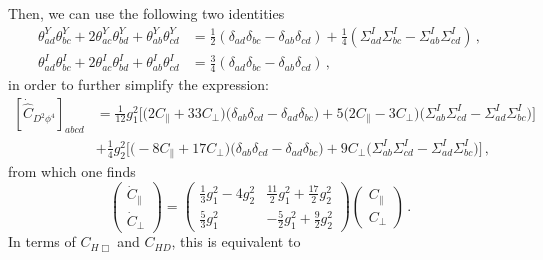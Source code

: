 Then, we can use the following two identities
\begin{align}
    \theta^Y_{ad}\theta^Y_{bc}+2\theta^Y_{ac}\theta^Y_{bd}+\theta^Y_{ab}\theta^Y_{cd}&=\frac{1}{2}\left(\delta_{ad}\delta_{bc}-\delta_{ab}\delta_{cd}\right)+\frac{1}{4}\left(\Sigma^I_{ad}\Sigma^I_{bc}-\Sigma^I_{ab}\Sigma^I_{cd}\right) \,,\\
    \theta^I_{ad}\theta^I_{bc}+2\theta^I_{ac}\theta^I_{bd}+\theta^I_{ab}\theta^I_{cd} &= \frac{3}{4} \left(\delta_{ad}\delta_{bc}-\delta_{ab}\delta_{cd}\right)\,,
\end{align}
in order to further simplify the expression:
\begin{align}
    \left[\dot{\widehat C}_{D^2\phi^4}\right]_{abcd} &= \frac{1}{12}g_1^2 \Big[
    \big(2C_\parallel + 33 C_\perp\big) \big(\delta_{ab}\delta_{cd}-\delta_{ad}\delta_{bc}\big)
    +5 \big(2C_\parallel - 3 C_\perp\big)\big(\Sigma^I_{ab}\Sigma^I_{cd}-\Sigma^I_{ad}\Sigma^I_{bc}\big)
    \Big]\nonumber \\
    &+\frac{1}{4}g_2^2 \Big[
    \big( -8C_\parallel + 17 C_\perp\big) \big(\delta_{ab}\delta_{cd}-\delta_{ad}\delta_{bc}\big)
    +9 C_\perp \big(\Sigma^I_{ab}\Sigma^I_{cd}-\Sigma^I_{ad}\Sigma^I_{bc}\big)
    \Big]\,,
\end{align}
from which one finds
\begin{equation}
     \begin{pmatrix}
    \dot C_\parallel \\ \dot C_\perp
\end{pmatrix}
=
 \begin{pmatrix}
    \frac{1}{3}g_1^2 - 4g_2^2 & \frac{11}{2}g_1^2+\frac{17}{2}g_2^2 \\
    \frac{5}{3}g_1^2 & -\frac{5}{2}g_1^2+\frac{9}{2}g_2^2
\end{pmatrix}
 \begin{pmatrix}
    C_\parallel \\ C_\perp
\end{pmatrix}\,.
\end{equation}
In terms of $C_{H\Box}$ and $C_{HD}$, this is equivalent to
